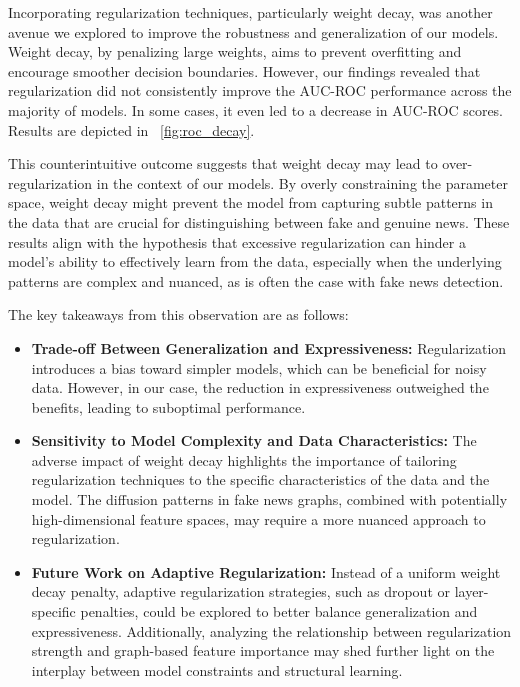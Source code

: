 \documentclass[sigconf,nonacm]{acmart}
\begin{document}
Incorporating regularization techniques, particularly weight decay, was another avenue we explored to improve the robustness and generalization of our models. Weight decay, by penalizing large weights, aims to prevent overfitting and encourage smoother decision boundaries. However, our findings revealed that regularization did not consistently improve the AUC-ROC performance across the majority of models. In some cases, it even led to a decrease in AUC-ROC scores. Results are depicted in ~\ref{fig:roc_decay}.

This counterintuitive outcome suggests that weight decay may lead to over-regularization in the context of our models. By overly constraining the parameter space, weight decay might prevent the model from capturing subtle patterns in the data that are crucial for distinguishing between fake and genuine news. These results align with the hypothesis that excessive regularization can hinder a model's ability to effectively learn from the data, especially when the underlying patterns are complex and nuanced, as is often the case with fake news detection.

The key takeaways from this observation are as follows:
\begin{itemize}
    \item \textbf{Trade-off Between Generalization and Expressiveness:} Regularization introduces a bias toward simpler models, which can be beneficial for noisy data. However, in our case, the reduction in expressiveness outweighed the benefits, leading to suboptimal performance.
    \item \textbf{Sensitivity to Model Complexity and Data Characteristics:} The adverse impact of weight decay highlights the importance of tailoring regularization techniques to the specific characteristics of the data and the model. The diffusion patterns in fake news graphs, combined with potentially high-dimensional feature spaces, may require a more nuanced approach to regularization.
    \item \textbf{Future Work on Adaptive Regularization:} Instead of a uniform weight decay penalty, adaptive regularization strategies, such as dropout or layer-specific penalties, could be explored to better balance generalization and expressiveness. Additionally, analyzing the relationship between regularization strength and graph-based feature importance may shed further light on the interplay between model constraints and structural learning.
\end{itemize}
\end{document}
